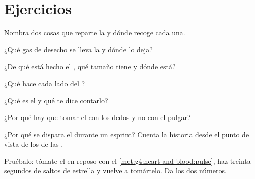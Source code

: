 \section{Ejercicios}

\begin{exercise}[$\star$]\label{exo:g4:heart-and-blood:1}
Nombra dos cosas que reparte la  y dónde recoge cada una.
\end{exercise}

\begin{exercise}[$\star$]\label{exo:g4:heart-and-blood:2}
¿Qué gas de desecho se lleva la  y dónde lo deja?
\end{exercise}

\begin{exercise}[$\star$]\label{exo:g4:heart-and-blood:3}
¿De qué está hecho el , qué tamaño tiene y dónde está?
\end{exercise}

\begin{exercise}[$\star$]\label{exo:g4:heart-and-blood:4}
¿Qué hace cada lado del ?
\end{exercise}

\begin{exercise}[$\star$]\label{exo:g4:heart-and-blood:5}
¿Qué es el  y qué te dice contarlo?
\end{exercise}

\begin{exercise}[$\star$]\label{exo:g4:heart-and-blood:6}
¿Por qué hay que tomar el  con los dedos y no con el pulgar?
\end{exercise}

\begin{exercise}[$\star$]\label{exo:g4:heart-and-blood:7}
¿Por qué se dispara el  durante un esprint? Cuenta la historia
desde el punto de vista de los  de las .
\end{exercise}

\begin{exercise}[$\star$]\label{exo:g4:heart-and-blood:8}
Pruébalo: tómate el  en reposo con el
\cref{met:g4:heart-and-blood:pulse}, haz treinta segundos de saltos de
estrella y vuelve a tomártelo. Da los dos números.
\end{exercise}

